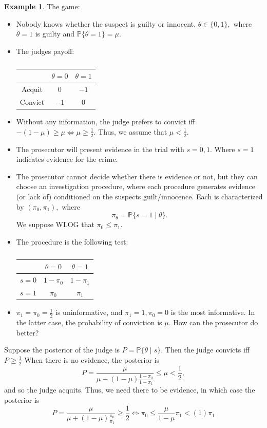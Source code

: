 \documentclass[10pt, oneside]{article}
\newcommand{\bbP}{\mathbb{P}}
\theoremstyle{definition}
\newtheorem{exmp}{Example}[section]
\begin{document}
\begin{exmp}
The game:
\begin{itemize}
    \item Nobody knows whether the suspect is guilty or innocent. $\theta \in \{0,1\},$ where $\theta = 1$ is guilty and $\bbP\{\theta = 1\} = \mu.$
    \item The judges payoff:
        \begin{table}[H]
            \centering
        \begin{tabular}{c|c|c}
             & $\theta = 0$ & $\theta = 1$\\
             \hline
             Acquit & $0$ & $-1$ \\
             \hline
             Convict &  $-1$& $0$\\
        \end{tabular}
        \caption{}
    \end{table}
    \item Without any information, the judge prefers to convict iff 
    $-(1-\mu) \geq \mu \iff \mu \geq \frac{1}{2}.$ Thus, we assume that $\mu < \frac{1}{2}.$
    \item The prosecutor will present evidence in the trial with $s = 0,1.$ Where $s = 1$ indicates evidence for the crime.
    \item The prosecutor cannot decide whether there is evidence or not, but they can choose an investigation procedure, where each procedure generates evidence (or lack of) conditioned on the suspects guilt/innocence. Each is characterized by $(\pi_0, \pi_1),$ where 
    \[\pi_\theta = \bbP\{s = 1 \mid \theta\}.\] We suppose WLOG that $\pi_0 \leq \pi_1.$
    \item The procedure is the following test: 
        \begin{table}[H]
            \centering
        \begin{tabular}{c|c|c}
             & $\theta = 0$ & $\theta = 1$\\
             \hline
             $s = 0$ & $1 - \pi_0$ & $1 - \pi_1$ \\
             \hline
             $s= 1$ &  $\pi_0$& $\pi_1$\\
        \end{tabular}
        \caption{}
    \end{table}
    \item $\pi_1 = \pi_0 = \frac{1}{2}$ is uninformative, and $\pi_1 = 1, \pi_0 = 0$ is the most informative. In the latter case, the probability of conviction is $\mu.$ How can the prosecutor do better?
\end{itemize}
Suppose the posterior of the judge is $P = \bbP\{\theta \mid s\}.$ Then the judge convicts iff $P \geq \frac{1}{2}$ When there is no evidence, the posterior is 
\[P = \frac{\mu}{\mu + (1-\mu)\frac{1 - \pi_0}{1 - \pi_1}}\leq \mu < \frac{1}{2},\] and so the judge acquits. Thus, we need there to be evidence, in which case the posterior is
\[P = \frac{\mu}{\mu + (1-\mu)\frac{\pi_0}{\pi_1}} \geq \frac{1}{2} \iff \pi_0 \leq \frac{\mu}{1-\mu}\pi_1 < (1)\pi_1\]


\end{exmp}
\end{document}
